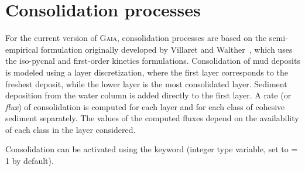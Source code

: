 \pagebreak
\section{Consolidation processes}
For the current version of \textsc{Gaia}, consolidation processes are based on the semi-empirical formulation originally developed by Villaret and Walther~\cite{VillaretWalther2008}, which uses the iso-pycnal and first-order kinetics formulations. Consolidation of mud deposits is modeled using a layer discretization, where the first layer corresponds to the freshest deposit, while the lower layer is the most consolidated layer. Sediment deposition from the water column is added directly to the first layer.
A rate (or \textit{flux}) of consolidation is computed for each layer and for each class of cohesive sediment separately. The values of the computed fluxes depend on the availability of each class in the layer considered.

Consolidation can be activated using the keyword  (integer type variable, set to {\ttfamily = 1} by default).

%

